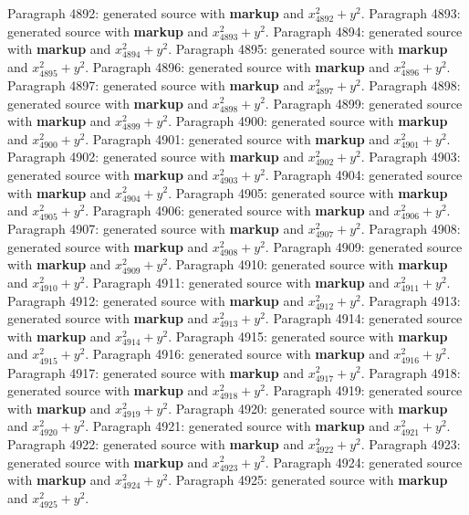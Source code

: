 \documentclass{article}
\begin{document}
Paragraph 4892: generated source with \textbf{markup} and $x_{4892}^2 + y^2$.
Paragraph 4893: generated source with \textbf{markup} and $x_{4893}^2 + y^2$.
Paragraph 4894: generated source with \textbf{markup} and $x_{4894}^2 + y^2$.
Paragraph 4895: generated source with \textbf{markup} and $x_{4895}^2 + y^2$.
Paragraph 4896: generated source with \textbf{markup} and $x_{4896}^2 + y^2$.
Paragraph 4897: generated source with \textbf{markup} and $x_{4897}^2 + y^2$.
Paragraph 4898: generated source with \textbf{markup} and $x_{4898}^2 + y^2$.
Paragraph 4899: generated source with \textbf{markup} and $x_{4899}^2 + y^2$.
Paragraph 4900: generated source with \textbf{markup} and $x_{4900}^2 + y^2$.
Paragraph 4901: generated source with \textbf{markup} and $x_{4901}^2 + y^2$.
Paragraph 4902: generated source with \textbf{markup} and $x_{4902}^2 + y^2$.
Paragraph 4903: generated source with \textbf{markup} and $x_{4903}^2 + y^2$.
Paragraph 4904: generated source with \textbf{markup} and $x_{4904}^2 + y^2$.
Paragraph 4905: generated source with \textbf{markup} and $x_{4905}^2 + y^2$.
Paragraph 4906: generated source with \textbf{markup} and $x_{4906}^2 + y^2$.
Paragraph 4907: generated source with \textbf{markup} and $x_{4907}^2 + y^2$.
Paragraph 4908: generated source with \textbf{markup} and $x_{4908}^2 + y^2$.
Paragraph 4909: generated source with \textbf{markup} and $x_{4909}^2 + y^2$.
Paragraph 4910: generated source with \textbf{markup} and $x_{4910}^2 + y^2$.
Paragraph 4911: generated source with \textbf{markup} and $x_{4911}^2 + y^2$.
Paragraph 4912: generated source with \textbf{markup} and $x_{4912}^2 + y^2$.
Paragraph 4913: generated source with \textbf{markup} and $x_{4913}^2 + y^2$.
Paragraph 4914: generated source with \textbf{markup} and $x_{4914}^2 + y^2$.
Paragraph 4915: generated source with \textbf{markup} and $x_{4915}^2 + y^2$.
Paragraph 4916: generated source with \textbf{markup} and $x_{4916}^2 + y^2$.
Paragraph 4917: generated source with \textbf{markup} and $x_{4917}^2 + y^2$.
Paragraph 4918: generated source with \textbf{markup} and $x_{4918}^2 + y^2$.
Paragraph 4919: generated source with \textbf{markup} and $x_{4919}^2 + y^2$.
Paragraph 4920: generated source with \textbf{markup} and $x_{4920}^2 + y^2$.
Paragraph 4921: generated source with \textbf{markup} and $x_{4921}^2 + y^2$.
Paragraph 4922: generated source with \textbf{markup} and $x_{4922}^2 + y^2$.
Paragraph 4923: generated source with \textbf{markup} and $x_{4923}^2 + y^2$.
Paragraph 4924: generated source with \textbf{markup} and $x_{4924}^2 + y^2$.
Paragraph 4925: generated source with \textbf{markup} and $x_{4925}^2 + y^2$.
\end{document}

